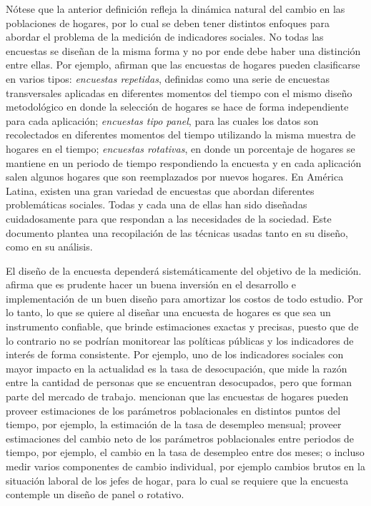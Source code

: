 Nótese que la anterior definición refleja la dinámica natural del cambio en las poblaciones de hogares, por lo cual se deben tener distintos enfoques para abordar el problema de la medición de indicadores sociales. No todas las encuestas se diseñan de la misma forma y no por ende debe haber una distinción entre ellas. Por ejemplo, \citet{Kalton_Citro_1993} afirman que las encuestas de hogares pueden clasificarse en varios tipos: \emph{encuestas repetidas}, definidas como una serie de encuestas transversales aplicadas en diferentes momentos del tiempo con el mismo diseño metodológico en donde la selección de hogares se hace de forma independiente para cada aplicación; \emph{encuestas tipo panel}, para las cuales los datos son recolectados en diferentes momentos del tiempo utilizando la misma muestra de hogares en el tiempo; \emph{encuestas rotativas}, en donde un porcentaje de hogares se mantiene en un periodo de tiempo respondiendo la encuesta y en cada aplicación salen algunos hogares que son reemplazados por nuevos hogares. En América Latina, existen una gran variedad de encuestas que abordan diferentes problemáticas sociales. Todas y cada una de ellas han sido diseñadas cuidadosamente para que respondan a las necesidades de la sociedad. Este documento plantea una recopilación de las técnicas usadas tanto en su diseño, como en su análisis.

El diseño de la encuesta dependerá sistemáticamente del objetivo de la medición. \citet{Kalton_2009} afirma que es prudente hacer un buena inversión en el desarrollo e implementación de un buen diseño para amortizar los costos de todo estudio. Por lo tanto, lo que se quiere al diseñar una encuesta de hogares es que sea un instrumento confiable, que brinde estimaciones exactas y precisas, puesto que de lo contrario no se podrían monitorear las políticas públicas y los indicadores de interés de forma consistente. Por ejemplo, uno de los indicadores sociales con mayor impacto en la actualidad es la tasa de desocupación, que mide la razón entre la cantidad de personas que se encuentran desocupados, pero que forman parte del mercado de trabajo. \citet{Duncan_Kalton_1987} mencionan que las encuestas de hogares pueden proveer estimaciones de los parámetros poblacionales en distintos puntos del tiempo, por ejemplo, la estimación de la tasa de desempleo mensual; proveer estimaciones del cambio neto de los parámetros poblacionales entre periodos de tiempo, por ejemplo, el cambio en la tasa de desempleo entre dos meses; o incluso medir varios componentes de cambio individual, por ejemplo cambios brutos en la situación laboral de los jefes de hogar, para lo cual se requiere que la encuesta contemple un diseño de panel o rotativo.

